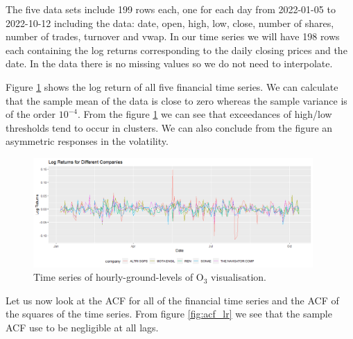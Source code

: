 \documentclass{article}
\begin{document}
The five data sets include 199 rows each, one for each day from 2022-01-05 to 2022-10-12 including the data: date, open, high, low, close, number of shares, number of trades, turnover and vwap. In our time series we will have 198 rows each containing the log returns corresponding to the daily closing prices and the date.
In the data there is no missing values so we do not need to interpolate. 

Figure \ref{fig:ts_lr} shows the log return of all five financial time series. 
We can calculate that the sample mean of the data is close to zero whereas the sample variance is of the order $10^{-4}$. From the figure \ref{fig:ts_lr} we can see that exceedances of high/low thresholds tend to occur in clusters. We can also conclude from the figure an asymmetric responses in the volatility.

\begin{figure}[ht!]
    \centering
    \includegraphics[width=0.95\textwidth]{Plots2/plot1.png}
    \caption{Time series of hourly-ground-levels of $\text{O}_3$ visualisation.}
    \label{fig:ts_lr}
\end{figure}

Let us now look at the ACF for all of the financial time series and the ACF of the squares of the time series. From figure
\ref{fig:acf_lr} we see that the sample ACF use to be negligible at all lags.  %
\end{document}
